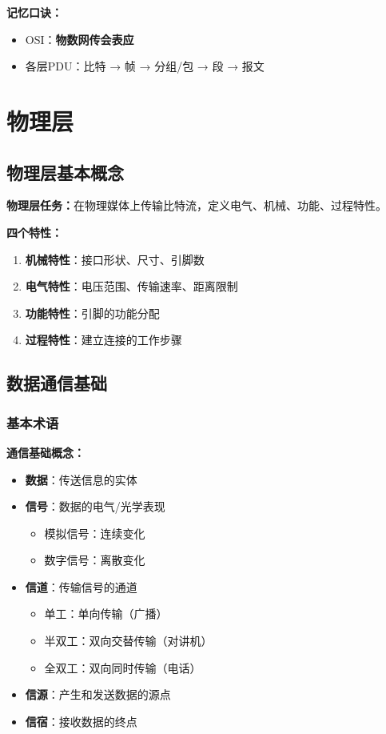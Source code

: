 \documentclass[lang=cn,newtx,10pt,scheme=chinese]{../../elegantbook}
\begin{document}
\textbf{记忆口诀：}
\begin{itemize}
  \item OSI：\textbf{物数网传会表应}
  \item 各层PDU：比特 → 帧 → 分组/包 → 段 → 报文
\end{itemize}

\chapter{物理层}

\section{物理层基本概念}

\textbf{物理层任务：}在物理媒体上传输比特流，定义电气、机械、功能、过程特性。

\textbf{四个特性：}
\begin{enumerate}
  \item \textbf{机械特性}：接口形状、尺寸、引脚数
  \item \textbf{电气特性}：电压范围、传输速率、距离限制
  \item \textbf{功能特性}：引脚的功能分配
  \item \textbf{过程特性}：建立连接的工作步骤
\end{enumerate}

\section{数据通信基础}

\subsection{基本术语}

\textbf{通信基础概念：}
\begin{itemize}
  \item \textbf{数据}：传送信息的实体
  \item \textbf{信号}：数据的电气/光学表现
    \begin{itemize}
      \item 模拟信号：连续变化
      \item 数字信号：离散变化
    \end{itemize}
  \item \textbf{信道}：传输信号的通道
    \begin{itemize}
      \item 单工：单向传输（广播）
      \item 半双工：双向交替传输（对讲机）
      \item 全双工：双向同时传输（电话）
    \end{itemize}
  \item \textbf{信源}：产生和发送数据的源点
  \item \textbf{信宿}：接收数据的终点
\end{itemize}
\end{document}
